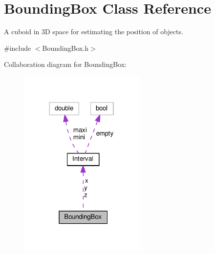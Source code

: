 \hypertarget{classBoundingBox}{}\section{Bounding\+Box Class Reference}
\label{classBoundingBox}


A cuboid in 3D space for estimating the position of objects.  




{\ttfamily \#include $<$Bounding\+Box.\+h$>$}



Collaboration diagram for Bounding\+Box\+:\nopagebreak
\begin{figure}[H]
\begin{center}
\leavevmode
\includegraphics[width=180pt]{classBoundingBox__coll__graph}
\end{center}
\end{figure}
